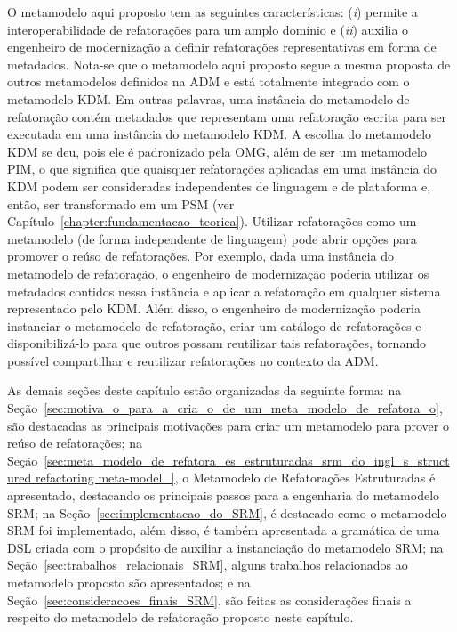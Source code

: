 O metamodelo aqui proposto tem as seguintes características: (\textit{i}) permite a interoperabilidade de refatorações para um amplo domínio e (\textit{ii}) auxilia o engenheiro de modernização a definir refatorações representativas em forma de metadados. Nota-se que o metamodelo aqui proposto segue a mesma proposta de outros metamodelos definidos na ADM e está totalmente integrado com o metamodelo KDM. Em outras palavras, uma instância do metamodelo de refatoração contém metadados que representam uma refatoração escrita para ser executada em uma instância do metamodelo KDM. A escolha do metamodelo KDM se deu, pois ele é padronizado pela OMG, além de ser um metamodelo PIM, o que significa que quaisquer refatorações aplicadas em uma instância do KDM podem ser consideradas independentes de linguagem e de plataforma e, então, ser transformado em um PSM (ver Capítulo~\ref{chapter:fundamentacao_teorica}). Utilizar refatorações como um metamodelo (de forma independente de linguagem) pode abrir opções para promover o reúso de refatorações. Por exemplo, dada uma instância do metamodelo de refatoração, o engenheiro de modernização poderia utilizar os metadados contidos nessa instância e aplicar a refatoração em qualquer sistema representado pelo KDM. Além disso, o engenheiro de modernização poderia instanciar o metamodelo de refatoração, criar um catálogo de refatorações e disponibilizá-lo para que outros possam reutilizar tais refatorações, tornando possível compartilhar e reutilizar refatorações no contexto da ADM.


As demais seções deste capítulo estão organizadas da seguinte forma: na Seção~\ref{sec:motiva_o_para_a_cria_o_de_um_meta_modelo_de_refatora_o}, são destacadas as principais motivações para criar um metamodelo para prover o reúso de refatorações; na Seção~\ref{sec:meta_modelo_de_refatora_es_estruturadas_srm_do_ingl_s_structured refactoring meta-model_}, o Metamodelo de Refatorações Estruturadas é apresentado, destacando os principais passos para a engenharia do metamodelo SRM; na Seção~\ref{sec:implementacao_do_SRM}, é destacado como o metamodelo SRM foi implementado, além disso, é também apresentada a gramática de uma DSL criada com o propósito de auxiliar a instanciação do metamodelo SRM; na Seção~\ref{sec:trabalhos_relacionais_SRM}, alguns trabalhos relacionados ao metamodelo proposto são apresentados; e na Seção~\ref{sec:consideracoes_finais_SRM}, são feitas as considerações finais a respeito do metamodelo de refatoração proposto neste capítulo.

